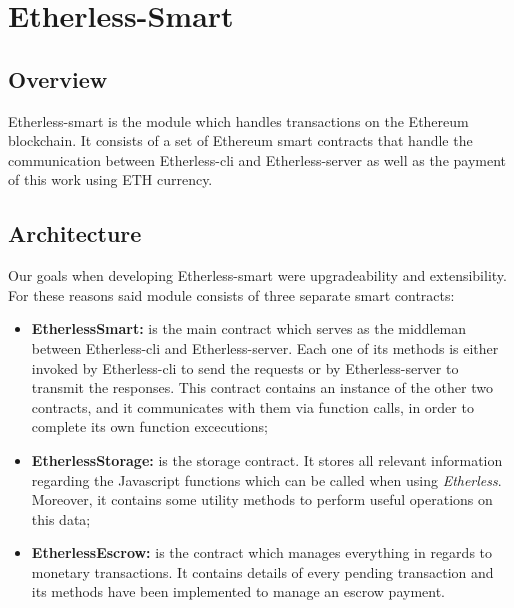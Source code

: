 \section{Etherless-Smart}

\subsection{Overview}
	Etherless-smart is the module which handles transactions on the Ethereum blockchain. It consists of a set of Ethereum smart contracts that handle the communication between Etherless-cli and Etherless-server as well as the payment of this work using ETH currency.

\subsection{Architecture} %
		Our goals when developing Etherless-smart were upgradeability and extensibility. For these reasons said module consists of three separate smart contracts:
		\begin{itemize}
			\item \textbf{EtherlessSmart:} is the main contract which serves as the middleman between Etherless-cli and Etherless-server. Each one of its methods is either invoked by Etherless-cli to send the requests or by Etherless-server to transmit the responses. This contract contains an instance of the other two contracts, and it communicates with them via function calls, in order to complete its own function excecutions;
			\item \textbf{EtherlessStorage:} is the storage contract. It stores all relevant information regarding the Javascript functions which can be called when using \textit{Etherless}. Moreover, it contains some utility methods to perform useful operations on this data;
			\item \textbf{EtherlessEscrow:} is the contract which manages everything in regards to monetary transactions. It contains details of every pending transaction and its methods have been implemented to manage an escrow payment.
		\end{itemize}

